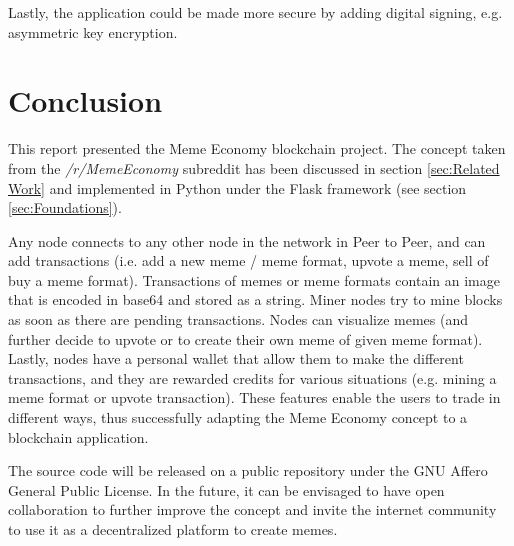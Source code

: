 \documentclass[12pt]{article}
\begin{document}
Lastly, the application could be made more secure by adding digital signing, e.g. asymmetric key encryption.

\section{Conclusion} \label{sec:Conclusion} %
This report presented the Meme Economy blockchain project. The concept taken from the \textit{/r/MemeEconomy} subreddit has been discussed in section \ref{sec:Related Work} and implemented in Python under the Flask framework (see section \ref{sec:Foundations}). 

Any node connects to any other node in the network in Peer to Peer, and can add transactions (i.e. add a new meme / meme format, upvote a meme, sell of buy a meme format). Transactions of memes or meme formats contain an image that is encoded in base64 and stored as a string. Miner nodes try to mine blocks as soon as there are pending transactions. Nodes can visualize memes (and further decide to upvote or to create their own meme of given meme format). Lastly, nodes have a personal wallet that allow them to make the different transactions, and they are rewarded credits for various situations (e.g. mining a meme format or upvote transaction). These features enable the users to trade in different ways, thus successfully adapting the Meme Economy concept to a blockchain application.

The source code will be released on a public repository under the GNU Affero General Public License. In the future, it can be envisaged to have open collaboration to further improve the concept and invite the internet community to use it as a decentralized platform to create memes.
\end{document}
